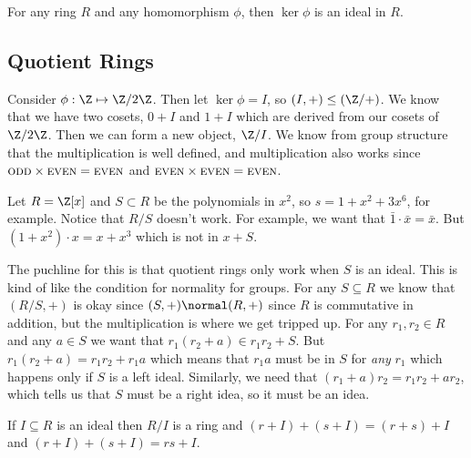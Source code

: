 \begin{example}
For any ring $R$ and any homomorphism $\phi$, then $\ker \phi$ is an ideal in $R$.
\end{example}

\subsection{Quotient Rings}

Consider $\phi : \Z \mapsto \Z/2\Z$. Then let $\ker\phi = I$, so $(I,+) \leq (\Z/+)$. We know that we have two cosets, $0 + I$ and $1 + I$ which are derived from our cosets of $\Z/2\Z$. Then we can form a new object, $\Z/I$. We know from group structure that the multiplication is well defined, and multiplication also works since $\textsc{odd} \times \textsc{even} = \textsc{even}$ and $\textsc{even} \times \textsc{even} = \textsc{even}$.

\begin{example}
Let $R = \Z[x]$ and $S \subset R$ be the polynomials in $x^2$, so $s = 1 + x^2 + 3x^6$, for example. Notice that $R/S$ doesn't work. For example, we want that $\bar{1} \cdot \bar{x} = \bar{x}$. But $(1 + x^2) \cdot x = x + x^3$ which is not in $x + S$.
\end{example}

The puchline for this is that quotient rings only work when $S$ is an ideal. This is kind of like the condition for normality for groups. For any $S \subseteq R$ we know that $(R/S,+)$ is okay since $(S,+) \normal (R,+)$ since $R$ is commutative in addition, but the multiplication is where we get tripped up. For any $r_1,r_2 \in R$ and any $a \in S$ we want that $r_1(r_2 + a) \in r_1r_2 + S$. But $r_1(r_2 + a) = r_1r_2 + r_1a$ which means that $r_1a$ must be in $S$ for \emph{any} $r_1$ which happens only if $S$ is a left  ideal. Similarly, we need that $(r_1 + a)r_2 = r_1r_2 + ar_2$, which tells us that $S$ must be a right idea, so it must be an idea.

\begin{proposition}
If $I \subseteq R$ is an ideal then $R/I$ is a ring and $(r + I) + (s + I) = (r+s) + I$ and $(r+I) + (s + I) = rs + I$.
\end{proposition}

\begin{example}
\end{example}

